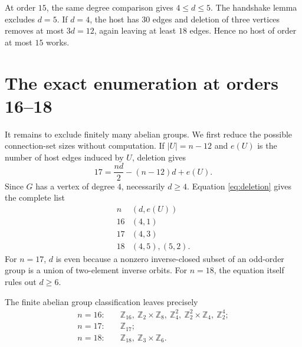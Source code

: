 \documentclass[11pt]{article}
\begin{document}
At order $15$, the same degree comparison gives $4\leq d\leq5$.
The handshake lemma excludes $d=5$.  If $d=4$, the host has $30$ edges
and deletion of three vertices removes at most $3d=12$, again leaving at
least $18$ edges.  Hence no host of order at most $15$ works.

\section{The exact enumeration at orders 16--18}

It remains to exclude finitely many abelian groups.  We first reduce the
possible connection-set sizes without computation.  If $|U|=n-12$ and
$e(U)$ is the number of host edges induced by $U$, deletion gives
\begin{equation}\label{eq:deletion}
  17=\frac{nd}{2}-(n-12)d+e(U).
\end{equation}
Since $G$ has a vertex of degree $4$, necessarily $d\geq4$.  Equation
\eqref{eq:deletion} gives the complete list
\[
\begin{array}{c|c}
n&(d,e(U))\\ \hline
16&(4,1)\\
17&(4,3)\\
18&(4,5),(5,2).
\end{array}
\]
For $n=17$, $d$ is even because a nonzero inverse-closed subset of an
odd-order group is a union of two-element inverse orbits.  For $n=18$,
the equation itself rules out $d\geq6$.

The finite abelian group classification leaves precisely
\begin{align*}
n=16:\quad &\mathbb Z_{16},\ \mathbb Z_2\times\mathbb Z_8,
\ \mathbb Z_4^2,\ \mathbb Z_2^2\times\mathbb Z_4,
\ \mathbb Z_2^4;\\
n=17:\quad &\mathbb Z_{17};\\
n=18:\quad &\mathbb Z_{18},\ \mathbb Z_3\times\mathbb Z_6.
\end{align*}
\end{document}
